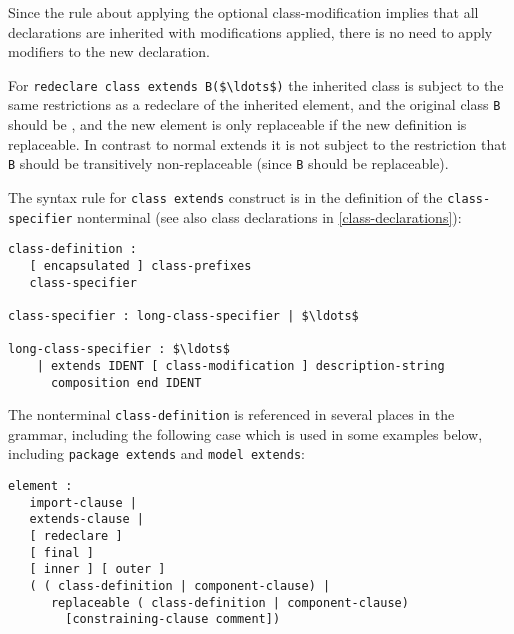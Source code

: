 \begin{nonnormative}
Since the rule about applying the optional class-modification implies that all declarations are inherited with modifications applied, there is no need
to apply modifiers to the new declaration.
\end{nonnormative}

For \lstinline!redeclare class extends B($\ldots$)! the inherited class is subject to the same restrictions as a redeclare of the inherited element, and the original class \lstinline!B! should be , and the new element is only replaceable if the new definition is replaceable.
In contrast to normal extends it is not subject to the restriction that \lstinline!B! should be transitively non-replaceable (since \lstinline!B! should be replaceable).

The syntax rule for \lstinline!class extends! construct is in the definition of the
\lstinline!class-specifier! nonterminal (see also class declarations in \cref{class-declarations}):
\begin{lstlisting}[language=grammar]
class-definition :
   [ encapsulated ] class-prefixes
   class-specifier

class-specifier : long-class-specifier | $\ldots$

long-class-specifier : $\ldots$
    | extends IDENT [ class-modification ] description-string
      composition end IDENT
\end{lstlisting}
The nonterminal \lstinline!class-definition! is referenced in several places in the
grammar, including the following case which is used in some examples
below, including \lstinline!package extends! and \lstinline!model extends!:
\begin{lstlisting}[language=grammar]
element :
   import-clause |
   extends-clause |
   [ redeclare ]
   [ final ]
   [ inner ] [ outer ]
   ( ( class-definition | component-clause) |
      replaceable ( class-definition | component-clause)
        [constraining-clause comment])
\end{lstlisting}

